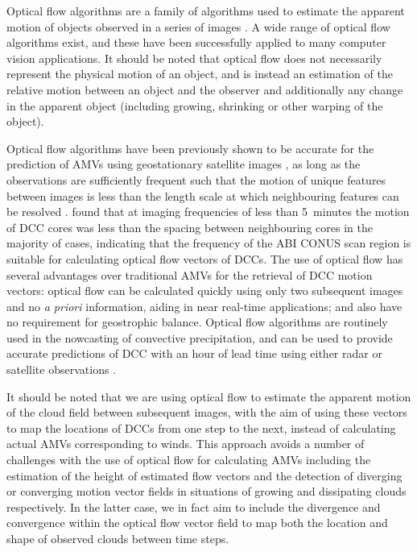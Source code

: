Optical flow algorithms are a family of algorithms used to estimate the apparent motion of objects observed in a series of images \citep{aggarwal_computation_1988}. 
A wide range of optical flow algorithms exist, and these have been successfully applied to many computer vision applications. 
It should be noted that optical flow does not necessarily represent the physical motion of an object, and is instead an estimation of the relative motion between an object and the observer and additionally any change in the apparent object (including growing, shrinking or other warping of the object). 

Optical flow algorithms have been previously shown to be accurate for the prediction of AMVs using geostationary satellite images \citep{wu_deriving_2016}, as long as the observations are sufficiently frequent such that the motion of unique features between images is less than the length scale at which neighbouring features can be resolved \citep{bresky_feasibility_2006}.
\citet{heikenfeld_tobac_2019} found that at imaging frequencies of less than 5~minutes the motion of DCC cores was less than the spacing between neighbouring cores in the majority of cases, indicating that the frequency of the ABI CONUS scan region is suitable for calculating optical flow vectors of DCCs.
The use of optical flow has several advantages over traditional AMVs for the retrieval of DCC motion vectors: optical flow can be calculated quickly using only two subsequent images and no \textit{a priori} information, aiding in near real-time applications; and also have no requirement for geostrophic balance. 
Optical flow algorithms are routinely used in the nowcasting of convective precipitation, and can be used to provide accurate predictions of DCC with an hour of lead time using either radar or satellite observations \citep[e.g.,][]{bowler_development_2004, bechini_enhanced_2017, woo_operational_2017}.

It should be noted that we are using optical flow to estimate the apparent motion of the cloud field between subsequent images, with the aim of using these vectors to map the locations of DCCs from one step to the next, instead of calculating actual AMVs corresponding to winds.
This approach avoids a number of challenges with the use of optical flow for calculating AMVs including the estimation of the height of estimated flow vectors and the detection of diverging or converging motion vector fields in situations of growing and dissipating clouds respectively.
In the latter case, we in fact aim to include the divergence and convergence within the optical flow vector field to map both the location and shape of observed clouds between time steps.

